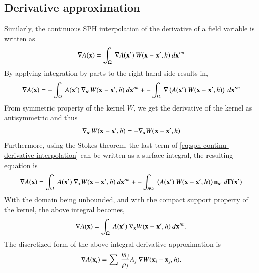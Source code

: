 \subsection{Derivative approximation}
Similarly, the continuous SPH interpolation of the derivative of a field variable
is written as
\begin{equation}
  \label{intro:eq:sph-continu-derivative-interpolation}
  \nabla A(\mathbf{x}) = \int_{\Omega}\> \nabla A(\mathbf{x}') \> W(\mathbf{x} - \mathbf{x}', h)  \> d\mathbf{x}'^{m}
\end{equation}
By applying integration by parts to the right hand side results in,
\begin{equation}
  \label{eq:sph-continu-derivative-interpolation}
  \nabla A(\mathbf{x}) = - \int_{\Omega}\> A(\mathbf{x}') \> \nabla_{\mathbf{x}'} W(\mathbf{x} - \mathbf{x}', h)  \> d\mathbf{x}'^{m} +
  - \int_{\Omega}\> \nabla \left( A(\mathbf{x}') \> W(\mathbf{x} - \mathbf{x}', h)\right)  \> d\mathbf{x}'^{m}
\end{equation}
From symmetric property of the kernel $W$, we get the derivative of the kernel
as antisymmetric and thus
\begin{equation}
  \label{intro:eq:sph-kernel-antisymmetric}
  \nabla_{\mathbf{x}'} W(\mathbf{x} - \mathbf{x}', h) = -\nabla_{\mathbf{x}} W(\mathbf{x} - \mathbf{x}', h)
\end{equation}
Furthermore, using the Stokes theorem, the last term of
\cref{eq:sph-continu-derivative-interpolation} can be written as a surface
integral, the resulting equation is
\begin{equation}
  \label{intro:eq:sph-continu-derivative-stokes}
  \nabla A(\mathbf{x}) = \int_{\Omega}\> A(\mathbf{x}') \> \nabla_{\mathbf{x}} W(\mathbf{x} - \mathbf{x}', h)  \> d\mathbf{x}'^{m} +
  - \int_{\partial \Omega}\> \left( A(\mathbf{x}') \> W(\mathbf{x} - \mathbf{x}', h)\right) \mathbf{n}_{\mathbf{x}'} \> d\boldsymbol{\Gamma}(\mathbf{x}')
\end{equation}
With the domain being unbounded, and with the compact support property of the
kernel, the above integral becomes,
\begin{equation}
  \label{intro:eq:sph-continu-derivative-final}
  \nabla A(\mathbf{x}) = \int_{\Omega}\> A(\mathbf{x}') \> \nabla_{\mathbf{x}} W(\mathbf{x} - \mathbf{x}', h)  \> d\mathbf{x}'^{m}.
\end{equation}
The discretized form of the above integral derivative approximation is
\begin{equation}
  \label{intro:eq:derivative-discrete_form}
  \nabla A(\mathbf{x}_i) = \sum\> \frac{m_j}{\rho_j} A_j\> \nabla W(\mathbf{x}_i - \mathbf{x}_j, h).
\end{equation}

